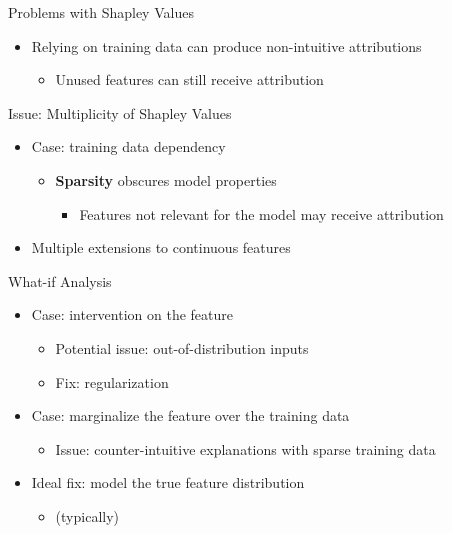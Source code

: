 \begin{frame}{Problems with Shapley Values}
\begin{itemize}
	\item Relying on training data can produce non-intuitive attributions
	\begin{itemize}
		\item Unused features can still receive attribution
	\end{itemize}
\end{itemize}
\end{frame}
\begin{frame}{Issue: Multiplicity of Shapley Values}
	\begin{itemize}
		\item Case: training data dependency
		\begin{itemize}
			\item \textbf{Sparsity} obscures model properties
			\begin{itemize}
				\item Features not relevant for the model may receive attribution
			\end{itemize}
		\end{itemize}
		\item Multiple extensions to continuous features
	\end{itemize}
\end{frame}
\begin{frame}{What-if Analysis}
	\begin{itemize}
		\item Case: intervention on the feature
		\begin{itemize}
			\item Potential issue: out-of-distribution inputs
			\item Fix: regularization
		\end{itemize}
		\item Case: marginalize the feature over the training data
		\begin{itemize}
			\item Issue: counter-intuitive explanations with sparse training data
		\end{itemize}
		\item Ideal fix: model the true feature distribution
		\begin{itemize}
			\item (typically) 
		\end{itemize}
	\end{itemize}
\end{frame}